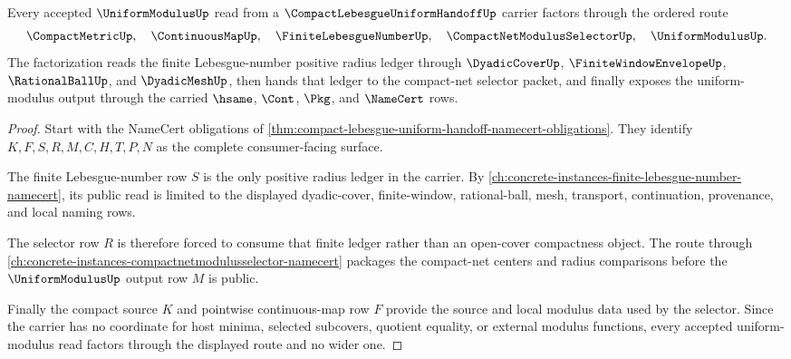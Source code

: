 \begin{theorem}
\label{thm:compact-lebesgue-uniform-handoff-factorization}
Every accepted $\UniformModulusUp$ read from a $\CompactLebesgueUniformHandoffUp$ carrier factors through the ordered route
$$
\CompactMetricUp,\quad \ContinuousMapUp,\quad \FiniteLebesgueNumberUp,\quad \CompactNetModulusSelectorUp,\quad \UniformModulusUp .
$$
The factorization reads the finite Lebesgue-number positive radius ledger through $\DyadicCoverUp$, $\FiniteWindowEnvelopeUp$, $\RationalBallUp$, and $\DyadicMeshUp$, then hands that ledger to the compact-net selector packet, and finally exposes the uniform-modulus output through the carried $\hsame$, $\Cont$, $\Pkg$, and $\NameCert$ rows.
\end{theorem}
\begin{proof}
Start with the NameCert obligations of \autoref{thm:compact-lebesgue-uniform-handoff-namecert-obligations}. They identify $K,F,S,R,M,C,H,T,P,N$ as the complete consumer-facing surface.

The finite Lebesgue-number row $S$ is the only positive radius ledger in the carrier. By \autoref{ch:concrete-instances-finite-lebesgue-number-namecert}, its public read is limited to the displayed dyadic-cover, finite-window, rational-ball, mesh, transport, continuation, provenance, and local naming rows.

The selector row $R$ is therefore forced to consume that finite ledger rather than an open-cover compactness object. The route through \autoref{ch:concrete-instances-compactnetmodulusselector-namecert} packages the compact-net centers and radius comparisons before the $\UniformModulusUp$ output row $M$ is public.

Finally the compact source $K$ and pointwise continuous-map row $F$ provide the source and local modulus data used by the selector. Since the carrier has no coordinate for host minima, selected subcovers, quotient equality, or external modulus functions, every accepted uniform-modulus read factors through the displayed route and no wider one.
\end{proof}



